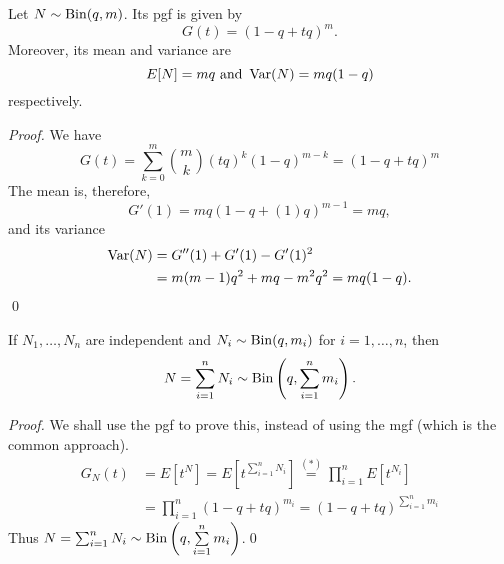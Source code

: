 \documentclass[notoc,notitlepage]{tufte-book}
\begin{document}
\begin{propo}\label{propo:pgf_of_binomial_distribution}
  Let $N \sim \operatorname{Bin}(q, m)$. Its pgf is given by
  \begin{equation*}
    G(t) = ( 1 - q + tq )^m.
  \end{equation*}
  Moreover, its mean and variance are
  \begin{equation*}
    E[N] = mq \text{ and } \operatorname{Var}(N) = mq(1 - q)
  \end{equation*}
  respectively.
\end{propo}

\begin{proof}
  We have
  \begin{equation*}
    G(t) = \sum_{k=0}^{m} \binom{m}{k} (tq)^k (1 - q)^{m - k} = ( 1 - q + tq )^m
  \end{equation*}
  The mean is, therefore,
  \begin{equation*}
    G'(1) = mq (1 - q + (1)q)^{m - 1} = mq,
  \end{equation*}
  and its variance
  \begin{align*}
    \operatorname{Var}(N) &= G''(1) + G'(1) - G'(1)^2 \\
            &= m(m-1)q^2 + mq - m^2 q^2 = mq ( 1 - q ).
  \end{align*}\qed\
\end{proof}

\begin{propo}\label{propo:sum_of_independent_binomial_rvs}
  If $N_1, \ldots, N_n$ are independent and $N_i \sim \operatorname{Bin}(q, m_i)$ for $i = 1, \ldots, n$, then
  \begin{equation*}
    N = \sum_{i=1}^{n} N_i \sim \operatorname{Bin} \left( q, \sum_{i=1}^{n} m_i \right).
  \end{equation*}
\end{propo}

\begin{proof}
  We shall use the pgf to prove this, instead of using the mgf (which is the common approach).
  \begin{align*}
    G_N(t) &= E \left[ t^N \right] = E \left[ t^{\sum_{i=1}^{n} N_i} \right] \overset{(*)}{=} \prod_{i=1}^{n} E \left[ t^{N_i} \right] \\
           &= \prod_{i=1}^{n} (1 - q + tq)^{m_i} = (1 - q + tq)^{\sum\limits_{i=1}^{n} m_i}
  \end{align*}
  Thus $N = \sum_{i=1}^{n} N_i \sim \operatorname{Bin} \left( q, \sum\limits_{i=1}^{n} m_i \right)$.\qed\
\end{proof}
\end{document}
